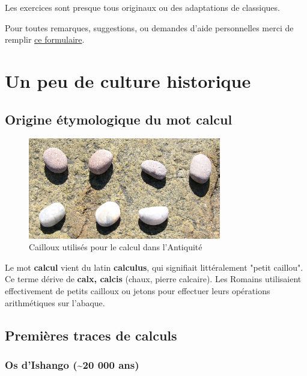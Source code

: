 \documentclass[11pt]{article}
\begin{document}
Les exercices sont presque tous originaux ou des adaptations de classiques.

\newpage

Pour toutes remarques, suggestions, ou demandes d'aide personnelles
merci de remplir \href{https://forms.gle/x7fAce7GqiJAGbsC7}{ce formulaire}.


\newpage


\section{Un peu de culture historique}
\label{sec:org527257a}
\subsection{Origine étymologique du mot calcul}
\label{sec:org5572889}

\begin{figure}[htbp]
\centering
\includegraphics[width=0.75\textwidth]{./images/Cailloux.jpeg}
\caption{Cailloux utilisés pour le calcul dans l'Antiquité}
\end{figure}



Le mot \textbf{calcul} vient du latin \textbf{calculus}, qui signifiait littéralement "petit caillou".
Ce terme dérive de \textbf{calx, calcis} (chaux, pierre calcaire).
Les Romains utilisaient effectivement de petits cailloux ou jetons pour effectuer leurs opérations arithmétiques sur l'abaque.

\newpage


\subsection{Premières traces de calculs}
\label{sec:org687ea61}

\subsubsection{Os d'Ishango (\textasciitilde{}20 000 ans)}
\label{sec:orgef2cad7}
\end{document}
